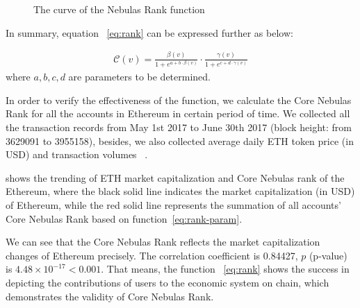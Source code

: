 \begin{figure}
\centering
{}
\caption{The curve of the Nebulas Rank function \label{fig-nr}}
\end{figure}


\vspace{2em}
In summary, equation ~\ref{eq:rank} can be expressed further as below:

\begin{align}
\label{eq:rank-param}
\mathcal{C}(v) =  \frac{\beta(v)}{1+e^{a + b \cdot \beta(v)}} \cdot \frac{\gamma(v)}{1+e^{c + d \cdot \gamma(v)}}
\end{align}
\noindent where $a, b, c, d$ are parameters to be determined.


In order to verify the effectiveness of the function, we calculate the Core Nebulas Rank for all the accounts in Ethereum in certain period of time. We collected all the transaction records from May 1st 2017 to June 30th 2017 (block height: from 3629091 to 3955158), besides, we also collected average daily ETH token price (in USD) and transaction volumes ~\cite{coinmarketcap}.

 shows the trending of ETH market capitalization and Core Nebulas rank of the Ethereum, where the black solid line indicates the market capitalization (in USD) of Ethereum, while the red solid line represents the summation of all accounts' Core Nebulas Rank based on function~\ref{eq:rank-param}.

We can see that the Core Nebulas Rank reflects the market capitalization changes of Ethereum precisely. The correlation coefficient is 0.84427, $p$ (p-value) is $4.48\times{}10^{-17}<0.001$. That means, the function ~\ref{eq:rank} shows the success in depicting the contributions of users to the economic system on chain, which demonstrates the validity of Core Nebulas Rank. 


